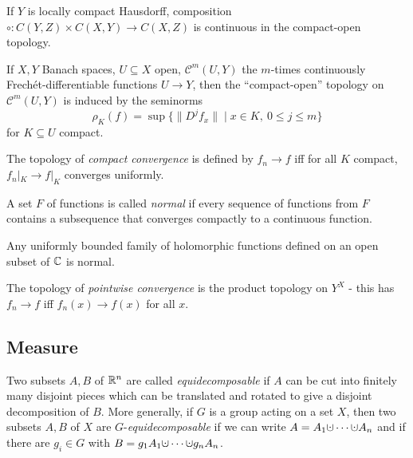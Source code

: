 \begin{prop} If $Y$ is locally compact Hausdorff, composition $\circ : C(Y,Z) \times C(X,Y) \rightarrow C(X,Z)$ is continuous in the compact-open topology.
\end{prop}

\begin{defn} If $X,Y$ Banach spaces, $U\subseteq X$ open, $\mathcal{C}^m(U,Y)$ the $m$-times continuously Frech\'et-differentiable functions $U \rightarrow Y$, then the ``compact-open'' topology on $\mathcal{C}^m(U,Y)$ is induced by the seminorms
\[
\rho_K(f) = \sup\{\|D^jf_x\| \mid x \in K,\ 0 \le j \le m\}
\]
for $K \subseteq U$ compact.
\end{defn}

\begin{defn} The topology of \emph{compact convergence} is defined by $f_n \rightarrow f$ iff for all $K$ compact, $f_n|_K \rightarrow f|_K$ converges uniformly.
\end{defn}

\begin{prop} A set $F$ of functions is called \emph{normal} if every sequence of functions from $F$ contains a subsequence that converges compactly to a continuous function.
\end{prop}

\begin{thm}[Montel] Any uniformly bounded family of holomorphic functions defined on an open subset of $\mathbb{C}$ is normal.
\end{thm}

\begin{defn} The topology of \emph{pointwise convergence} is the product topology on $Y^X$ - this has $f_n \rightarrow f$ iff $f_n(x) \rightarrow f(x)$ for all $x$.
\end{defn}


\subsection{Measure}

\begin{defn} Two subsets $A,B$ of $\mathbb{R}^n$ are called \emph{equidecomposable} if $A$ can be cut into finitely many disjoint pieces which can be translated and rotated to give a disjoint decomposition of $B$. More generally, if $G$ is a group acting on a set $X$, then two subsets $A,B$ of $X$ are $G$-\emph{equidecomposable} if we can write $A = A_1 \dotcup \cdots \dotcup A_n$ and if there are $g_i \in G$ with $B = g_1A_1 \dotcup \cdots \dotcup g_nA_n$.%
\end{defn}

